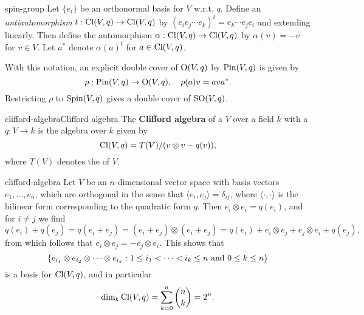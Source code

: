 \begin{example}{spin-group}
    Let $\{ e_i \}$ be an orthonormal basis for $V$ w.r.t. $q$. Define an \textit{antiautomorphism} $t : \textup{Cl}(V, q) \to \textup{Cl}(V, q)$ by $(e_i e_j \cdots e_k)^t = e_k \cdots e_j e_i$ and extending linearly. Then define the automorphism $\alpha : \textup{Cl}(V, q) \to \textup{Cl}(V, q)$ by $\alpha(v) = -v$ for $v \in V$. Let $a^*$ denote $\alpha(a)^t$ for $a \in \textup{Cl}(V, q)$.
    
    With this notation, an explicit double cover of $\textup{O}(V, q)$ by $\textup{Pin}(V, q)$ is given by
    \[ \rho : \textup{Pin}(V, q) \to \textup{O}(V, q), \quad \rho(a) v = a v a^* . \]
    Restricting $\rho$ to $\textup{Spin}(V, q)$ gives a double cover of $\textup{SO}(V, q)$.
\end{example}

\begin{topic}{clifford-algebra}{Clifford algebra}
    The \textbf{Clifford algebra} of a  $V$ over a field $k$ with a  $q : V \to k$ is the algebra over $k$ given by
    \[ \textup{Cl}(V, q) = T(V) / (v \otimes v - q(v)) , \]
    where $T(V)$ denotes the  of $V$.
\end{topic}

\begin{example}{clifford-algebra}
    Let $V$ be an $n$-dimensional vector space with basis vectors $e_1, \ldots, e_n$, which are orthogonal in the sense that $\langle e_i, e_j \rangle = \delta_{ij}$, where $\langle \cdot, \cdot \rangle$ is the bilinear form corresponding to the quadratic form $q$. Then $e_i \otimes e_i = q(e_i)$, and for $i \ne j$ we find
    \[ q(e_i) + q(e_j) = q(e_i + e_j) = (e_i + e_j) \otimes (e_i + e_j) = q(e_i) + e_i \otimes e_j + e_j \otimes e_i + q(e_j) , \]
    from which follows that $e_i \otimes e_j = - e_j \otimes e_i$. This shows that
    \[ \{ e_{i_1} \otimes e_{i_2} \otimes \cdots \otimes e_{i_k} : 1 \le i_1 < \cdots < i_k \le n \textup{ and } 0 \le k \le n  \} \]
    is a basis for $\textup{Cl}(V, q)$, and in particular
    \[ \dim_k \textup{Cl}(V, q) = \sum_{k = 0}^{n} \binom{n}{k} = 2^n . \]
\end{example}

